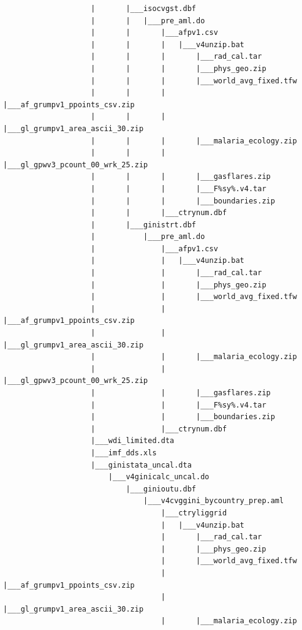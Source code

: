 \documentclass[]{book}
\begin{document}
\begin{verbatim}
                    |       |___isocvgst.dbf
                    |       |   |___pre_aml.do
                    |       |       |___afpv1.csv
                    |       |       |   |___v4unzip.bat
                    |       |       |       |___rad_cal.tar
                    |       |       |       |___phys_geo.zip
                    |       |       |       |___world_avg_fixed.tfw
                    |       |       |       |___af_grumpv1_ppoints_csv.zip
                    |       |       |       |___gl_grumpv1_area_ascii_30.zip
                    |       |       |       |___malaria_ecology.zip
                    |       |       |       |___gl_gpwv3_pcount_00_wrk_25.zip
                    |       |       |       |___gasflares.zip
                    |       |       |       |___F%sy%.v4.tar
                    |       |       |       |___boundaries.zip
                    |       |       |___ctrynum.dbf
                    |       |___ginistrt.dbf
                    |           |___pre_aml.do
                    |               |___afpv1.csv
                    |               |   |___v4unzip.bat
                    |               |       |___rad_cal.tar
                    |               |       |___phys_geo.zip
                    |               |       |___world_avg_fixed.tfw
                    |               |       |___af_grumpv1_ppoints_csv.zip
                    |               |       |___gl_grumpv1_area_ascii_30.zip
                    |               |       |___malaria_ecology.zip
                    |               |       |___gl_gpwv3_pcount_00_wrk_25.zip
                    |               |       |___gasflares.zip
                    |               |       |___F%sy%.v4.tar
                    |               |       |___boundaries.zip
                    |               |___ctrynum.dbf
                    |___wdi_limited.dta
                    |___imf_dds.xls
                    |___ginistata_uncal.dta
                        |___v4ginicalc_uncal.do
                            |___ginioutu.dbf
                                |___v4cvggini_bycountry_prep.aml
                                    |___ctryliggrid
                                    |   |___v4unzip.bat
                                    |       |___rad_cal.tar
                                    |       |___phys_geo.zip
                                    |       |___world_avg_fixed.tfw
                                    |       |___af_grumpv1_ppoints_csv.zip
                                    |       |___gl_grumpv1_area_ascii_30.zip
                                    |       |___malaria_ecology.zip

\end{verbatim}
\end{document}
